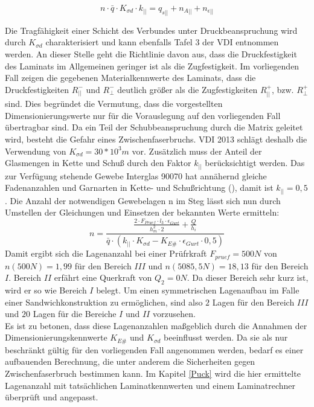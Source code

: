 \begin{equation}
	n\cdot \bar{q}\cdot K_{\sigma d}\cdot k_{||}=q_{s||}+n_{A||}+n_{\epsilon||} 
\end{equation}

\noindent Die Tragfähigkeit einer Schicht des Verbundes unter Druckbeanspruchung wird durch $ K_{\sigma d} $ charakterisiert und kann ebenfalls Tafel 3 der VDI entnommen werden. An dieser Stelle geht die Richtlinie davon aus, dass die Druckfestigkeit des Laminats im Allgemeinen geringer ist als die Zugfestigkeit. Im vorliegenden Fall zeigen die gegebenen Materialkennwerte des Laminats, dass die Druckfestigkeiten $ R_{||}^{-} $ und $ R_{\perp}^{-} $ deutlich größer als die Zugfestigkeiten $ R_{||}^{+} $, bzw. $ R_{\perp}^{+} $ sind. Dies begründet die Vermutung, dass die vorgestellten Dimensionierungswerte nur für die Vorauslegung auf den vorliegenden Fall übertragbar sind. Da ein Teil der Schubbeanspruchung durch die Matrix geleitet wird, besteht die Gefahr eines Zwischenfaserbruchs. VDI 2013 schlägt deshalb die Verwendung von $ K_{\sigma d}=30*10^{3}m $ vor. Zusätzlich muss der Anteil der Glasmengen in Kette und Schuß durch den Faktor $ k_{||} $ berücksichtigt werden. Das zur Verfügung stehende Gewebe Interglas 90070 hat annähernd gleiche Fadenanzahlen und Garnarten in Kette- und Schußrichtung (\cite{item18}), damit ist $ k_{||}=0,5 $. Die Anzahl der notwendigen Gewebelagen n im Steg lässt sich nun durch Umstellen der Gleichungen und Einsetzen der bekannten Werte ermitteln:\\

\begin{equation}
	n=\frac{\frac{2\cdot F_{Pruef}\cdot l_{3}\cdot \epsilon_{Gurt}}{h_{m}^{2}\cdot 2}+\frac{Q}{h_{i}}}{\bar{q}\cdot \left(k_{||}\cdot K_{\sigma d}-K_{E\#}\cdot \epsilon_{Gurt}\cdot 0,5\right)}
\end{equation}
Damit ergibt sich die Lagenanzahl bei einer Prüfrkraft $ F_{pruef}=500N $ von $ n\left(500N\right)=1,99 $ für den Bereich $ III $ und $ n\left(5085,5N\right)=18,13 $ für den Bereich $ I $. Bereich $ II $ erfährt eine Querkraft von $Q_{2}=0N $. Da dieser Bereich sehr kurz ist, wird er so wie Bereich $ I $ belegt. Um einen symmetrischen Lagenaufbau im Falle einer Sandwichkonstruktion zu ermöglichen, sind also $ 2 $ Lagen für den Bereich $ III $ und $ 20 $ Lagen für die Bereiche $ I $ und $ II $ vorzusehen.\\

\noindent Es ist zu betonen, dass diese Lagenanzahlen maßgeblich durch die Annahmen der Dimensionierungskennwerte $ K_{E\#} $ und $ K_{\sigma d} $ beeinflusst werden. Da sie als nur beschränkt gültig für den vorliegenden Fall angenommen werden, bedarf es einer aufbauenden Berechnung, die unter anderem die Sicherheiten gegen Zwischenfaserbruch bestimmen kann. Im Kapitel \ref{Puck} wird die hier ermittelte Lagenanzahl mit tatsächlichen Laminatkennwerten und einem Laminatrechner überprüft und angepasst.

